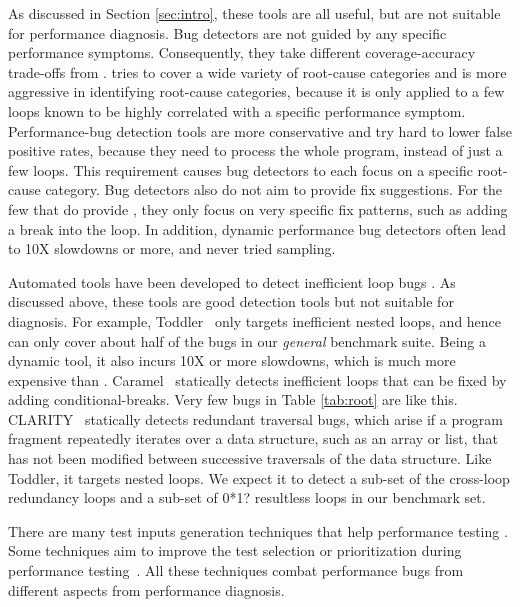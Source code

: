 As discussed in 
Section \ref{sec:intro}, these tools are all useful, 
but are not suitable for performance diagnosis.
Bug detectors are not guided by any specific
performance symptoms. Consequently, they take different coverage-accuracy
trade-offs from \Tool. \Tool tries to cover a wide variety of root-cause 
categories and is more aggressive in identifying root-cause categories, because
it is only applied to a few loops known to be highly
correlated with a specific performance symptom.
Performance-bug detection tools are more conservative and try hard
to lower false positive rates, because they need to process the
whole program, instead of just a few loops. This requirement causes bug
detectors to each focus on a specific root-cause category.
Bug detectors also do not aim to provide fix suggestions.
For the few that do provide \cite{CARAMEL}, they only focus on very specific
fix patterns, such as adding a break into the loop. 
In addition, dynamic performance bug detectors often lead to 10X slowdowns or 
more, and never tried sampling.

Automated tools have been developed to detect inefficient loop bugs
\cite{Alabama, CARAMEL, IsilDillig.PLDI15}. 
As discussed above, these tools are good detection tools but not suitable for 
diagnosis. 
For example, Toddler~\cite{Alabama} only targets inefficient nested loops, and
hence can only cover about half of the bugs in our \emph{general} benchmark suite.
Being a dynamic tool, it also incurs 10X or more slowdowns, which is much more
expensive than \Tool. 
Caramel~\cite{CARAMEL} statically detects inefficient loops that can be fixed
by adding conditional-breaks. Very few bugs in Table \ref{tab:root} are like this.
CLARITY~\cite{IsilDillig.PLDI15} statically detects redundant traversal bugs, 
which arise if a program fragment repeatedly iterates over a data structure, such as an array or list, that has not been modified between successive traversals of the data structure.
Like Toddler, it targets nested loops.
We expect it to detect a sub-set of the cross-loop redundancy
loops and a sub-set of 0*1? resultless loops in our benchmark set.

There are many test inputs generation techniques that help
performance testing 
\cite{WISE, EventBreak, SpeedGun}.
Some techniques aim to improve the test selection or prioritization during 
performance testing~\cite{Forepost,Huang:2014:PRT:2568225.2568232}.  
All these techniques combat performance bugs from different aspects from performance diagnosis.
